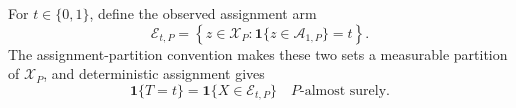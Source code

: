 For \(t\in\{0,1\}\), define the observed assignment arm
\[
 \mathcal E_{t,P}
 =\left\{z\in\mathcal X_P:
 \mathbf 1\{z\in\mathcal A_{1,P}\}=t\right\}.
\]
The assignment-partition convention makes these two sets a measurable partition of \(\mathcal X_P\), and deterministic assignment gives
\[
 \mathbf 1\{T=t\}=\mathbf 1\{X\in\mathcal E_{t,P}\}
 \quad P\text{-almost surely}.
\]